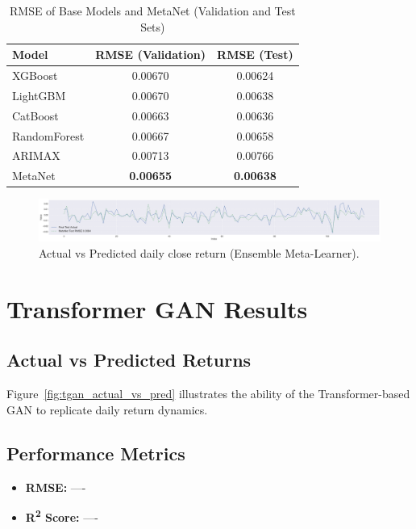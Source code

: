 \begin{table}[h!]
\centering
\caption{RMSE of Base Models and MetaNet (Validation and Test Sets)}
\label{tab:ensemble_base_models}
\begin{tabular}{lcc}
\toprule
\textbf{Model} & \textbf{RMSE (Validation)} & \textbf{RMSE (Test)} \\
\midrule
XGBoost     & 0.00670 & 0.00624 \\
LightGBM    & 0.00670 & 0.00638 \\
CatBoost    & 0.00663 & 0.00636 \\
RandomForest & 0.00667 & 0.00658 \\
ARIMAX      & 0.00713 & 0.00766 \\
MetaNet     & \textbf{0.00655} & \textbf{0.00638} \\
\bottomrule
\end{tabular}
\end{table}

\begin{figure}[h!]
    \centering
    \includegraphics[width=\textwidth]{Images/metanet_final_test_plot_s.pdf}
    \caption{Actual vs Predicted daily close return (Ensemble Meta-Learner).}
    \label{fig:ensemble_actual_vs_pred}
\end{figure}

\section{Transformer GAN Results}
\subsection{Actual vs Predicted Returns}
Figure~\ref{fig:tgan_actual_vs_pred} illustrates the ability of the Transformer-based GAN to replicate daily return dynamics.

\subsection{Performance Metrics}
\begin{itemize}
    \item \textbf{RMSE:} ----
    \item \textbf{R\textsuperscript{2} Score:} ----
\end{itemize}

